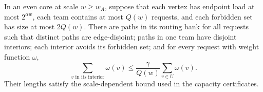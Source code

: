 \begin{lemma}\label{lem:routing}
In an even core at scale $w\ge w_A$, suppose that each vertex has endpoint
load at most $2^{\alpha w}$, each team contains at most $Q(w)$ requests,
and each forbidden set has size at most $2Q(w)$. There are paths in its
routing bank for all requests such that distinct paths are edge-disjoint;
paths in one team have disjoint interiors; each interior avoids its
forbidden set; and for every request with weight function $\omega$,
\begin{equation}\label{eq:soft-route}
       \sum_{v\text{ in its interior}}\omega(v)
                 \le\frac\gamma{Q(w)}\sum_{v\in U}\omega(v).
\end{equation}
Their lengths satisfy the scale-dependent bound
 used in the capacity certificates.
\end{lemma}
